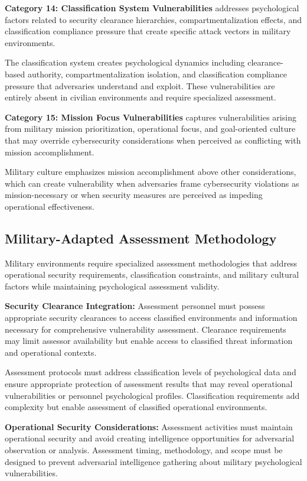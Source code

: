 \documentclass[10pt, twocolumn]{article}
\begin{document}
\textbf{Category 14: Classification System Vulnerabilities} addresses psychological factors related to security clearance hierarchies, compartmentalization effects, and classification compliance pressure that create specific attack vectors in military environments.

The classification system creates psychological dynamics including clearance-based authority, compartmentalization isolation, and classification compliance pressure that adversaries understand and exploit. These vulnerabilities are entirely absent in civilian environments and require specialized assessment.

\textbf{Category 15: Mission Focus Vulnerabilities} captures vulnerabilities arising from military mission prioritization, operational focus, and goal-oriented culture that may override cybersecurity considerations when perceived as conflicting with mission accomplishment.

Military culture emphasizes mission accomplishment above other considerations, which can create vulnerability when adversaries frame cybersecurity violations as mission-necessary or when security measures are perceived as impeding operational effectiveness.

\subsection{Military-Adapted Assessment Methodology}

Military environments require specialized assessment methodologies that address operational security requirements, classification constraints, and military cultural factors while maintaining psychological assessment validity.

\textbf{Security Clearance Integration:} Assessment personnel must possess appropriate security clearances to access classified environments and information necessary for comprehensive vulnerability assessment. Clearance requirements may limit assessor availability but enable access to classified threat information and operational contexts.

Assessment protocols must address classification levels of psychological data and ensure appropriate protection of assessment results that may reveal operational vulnerabilities or personnel psychological profiles. Classification requirements add complexity but enable assessment of classified operational environments.

\textbf{Operational Security Considerations:} Assessment activities must maintain operational security and avoid creating intelligence opportunities for adversarial observation or analysis. Assessment timing, methodology, and scope must be designed to prevent adversarial intelligence gathering about military psychological vulnerabilities.
\end{document}
